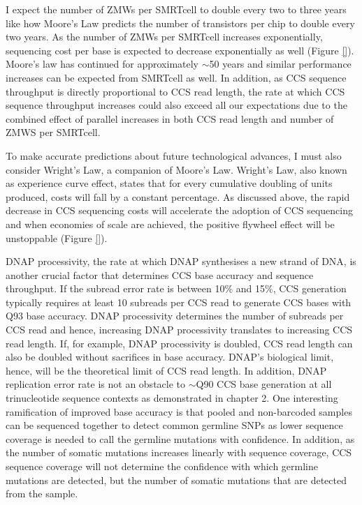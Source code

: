I expect the number of ZMWs per SMRTcell to double every two to three years like how Moore’s Law predicts the number of transistors per chip to double every two years. As the number of ZMWs per SMRTcell increases exponentially, sequencing cost per base is expected to decrease exponentially as well (Figure \ref{}). Moore’s law has continued for approximately $\sim$50 years and similar performance increases can be expected from SMRTcell as well. In addition, as CCS sequence throughput is directly proportional to CCS read length, the rate at which CCS sequence throughput increases could also exceed all our expectations due to the combined effect of parallel increases in both CCS read length and number of ZMWS per SMRTcell. 

To make accurate predictions about future technological advances, I must also consider Wright’s Law, a companion of Moore’s Law. Wright’s Law, also known as experience curve effect, states that for every cumulative doubling of units produced, costs will fall by a constant percentage. As discussed above, the rapid decrease in CCS sequencing costs will accelerate the adoption of CCS sequencing and when economies of scale are achieved, the positive flywheel effect will be unstoppable (Figure \ref{}). 

DNAP processivity, the rate at which DNAP synthesises a new strand of DNA, is another crucial factor that determines CCS base accuracy and sequence throughput. If the subread error rate is between 10\% and 15\%, CCS generation typically requires at least 10 subreads per CCS read to generate CCS bases with Q93 base accuracy. DNAP processivity determines the number of subreads per CCS read and hence, increasing DNAP processivity translates to increasing CCS read length. If, for example, DNAP processivity is doubled, CCS read length can also be doubled without sacrifices in base accuracy. DNAP’s biological limit, hence, will be the theoretical limit of CCS read length. In addition, DNAP replication error rate is not an obstacle to $\sim$Q90 CCS base generation at all trinucleotide sequence contexts as demonstrated in chapter 2. One interesting ramification of improved base accuracy is that pooled and non-barcoded samples can be sequenced together to detect common germline SNPs as lower sequence coverage is needed to call the germline mutations with confidence. In addition, as the number of somatic mutations increases linearly with sequence coverage, CCS sequence coverage will not determine the confidence with which germline mutations are detected, but the number of somatic mutations that are detected from the sample. 

